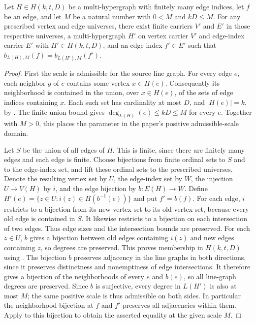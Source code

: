 \begin{helper}
Let $H\in H(k,t,D)$ be a multi-hypergraph with finitely many edge indices,
let $f$ be an edge, and let $M$ be a natural number with $0<M$ and
$kD\le M$. For any prescribed vertex and edge universes, there exist
finite carriers $V'$ and $E'$ in those respective universes, a
multi-hypergraph $H'$ on vertex carrier $V'$ and edge-index carrier $E'$
with $H'\in H(k,t,D)$, and an edge index $f'\in E'$ such that
$b_{L(H),M}(f)=b_{L(H'),M}(f')$.
\end{helper}
\begin{proof}
First the scale is admissible for the source line graph. For every edge
$e$, each neighbor $g$ of $e$ contains some vertex $x\in H(e)$.
Consequently its neighborhood is contained in the union, over
$x\in H(e)$, of the sets of edge indices containing $x$. Each such set
has cardinality at most $D$, and $|H(e)|=k$, by
. The finite union bound gives
$\deg_{L(H)}(e)\le kD\le M$ for every $e$. Together with $M>0$,
this places the parameter in the paper's positive admissible-scale domain.

Let $S$ be the union of all edges of $H$. This is finite, since there are
finitely many edges and each edge is finite. Choose bijections from finite
ordinal sets to $S$ and to the edge-index set, and lift these ordinal sets
to the prescribed universes. Denote the resulting vertex set by $U$, the
edge-index set by $W$, the injection $U\to V(H)$ by $i$, and the edge
bijection by $b:E(H)\to W$. Define
$H'(e)=\{z\in U:i(z)\in H(b^{-1}(e))\}$ and put $f'=b(f)$.
For each edge, $i$ restricts to a bijection from its new vertex set to its
old vertex set, because every old edge is contained in $S$. It likewise
restricts to a bijection on each intersection of two edges. Thus edge sizes
and the intersection bounds are preserved. For each $z\in U$, $b$ gives
a bijection between old edges containing $i(z)$ and new edges containing
$z$, so degrees are preserved. This proves membership in $H(k,t,D)$
using .
The bijection $b$ preserves adjacency in the line graphs in both directions,
since it preserves distinctness and nonemptiness of edge intersections.
It therefore gives a bijection of the neighborhoods of every $e$ and
$b(e)$, so all line-graph degrees are preserved. Since $b$ is surjective,
every degree in $L(H')$ is also at most $M$; the same positive scale is
thus admissible on both sides. In particular the neighborhood bijection
at $f$ and $f'$ preserves all adjacencies within them. Apply
 to this bijection
to obtain the asserted equality at the given scale $M$.
\end{proof}
